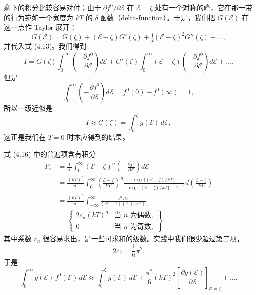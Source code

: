 剩下的积分比较容易对付；由于 $\partial f^{0}/\partial\mathcal{E}$ 在 $\mathcal{E}=\zeta$ 处有一个对称的峰，它在那一带的行为宛如一个宽度为 $kT$ 的 $\delta$ 函数（delta-function）。于是，我们把 $G(\mathcal{E})$ 在这一点作 Taylor 展开：
\begin{equation*}
G(\mathcal{E})=G(\zeta)+(\mathcal{E}-\zeta)G'(\zeta)+\tfrac{1}{2}(\mathcal{E}-\zeta)^{2}G''(\zeta)+\dots,
\tag{4.15}
\end{equation*}
并代入式 (4.13)。我们得到
\begin{equation*}
I=G(\zeta)\int_{0}^{\infty}\left(-\frac{\partial f^{0}}{\partial\mathcal{E}}\right)d\mathcal{E}+G'(\zeta)\int_{0}^{\infty}(\mathcal{E}-\zeta)\left(-\frac{\partial f^{0}}{\partial\mathcal{E}}\right)d\mathcal{E}+\dots.
\tag{4.16}
\end{equation*}
但是
\begin{equation*}
\int_{0}^{\infty}\left(-\frac{\partial f^{0}}{\partial\mathcal{E}}\right)d\mathcal{E}=f^{0}(0)-f^{0}(\infty)=1,
\tag{4.17}
\end{equation*}
所以一级近似是
\begin{equation*}
I\approx G(\zeta)=\int_{0}^{\zeta}g(\mathcal{E})\,d\mathcal{E},
\tag{4.18}
\end{equation*}
这正是我们在 $T=0$ 时本应得到的结果。


式 (4.16) 中的普遍项含有积分
\begin{align*}
F_{n}&=\frac{1}{n!}\int_{0}^{\infty}(\mathcal{E}-\zeta)^{n}\left(-\frac{\partial f^{0}}{\partial\mathcal{E}}\right)d\mathcal{E}\\
&=\frac{(kT)^{n}}{n!}\int_{0}^{\infty}\left(\frac{\mathcal{E}-\zeta}{kT}\right)^{n}\frac{\exp\{(\mathcal{E}-\zeta)/kT\}}{\left[\exp\{(\mathcal{E}-\zeta)/kT\}+1\right]^{2}}\,d\!\left(\frac{\mathcal{E}-\zeta}{kT}\right)\\
&=\frac{(kT)^{n}}{n!}\int_{-\infty}^{\infty}\frac{z^{n}\,dz}{(e^{z}+1)(1+e^{-z})}\\
&=\left\{\begin{array}{ll}
2c_{n}(kT)^{n} & \text{当 } n \text{ 为偶数},\\
0 & \text{当 } n \text{ 为奇数},
\end{array}\right\}
\tag{4.19}
\end{align*}
其中系数 $c_{n}$ 很容易求出，是一些可求和的级数。实践中我们很少超过第二项，
\begin{equation*}
2c_{2}=\frac{1}{6}\pi^{2}.
\tag{4.20}
\end{equation*}
于是
\begin{equation*}
\int_{0}^{\infty}g(\mathcal{E})\,f^{0}(\mathcal{E})\,d\mathcal{E}\approx\int_{0}^{\zeta}g(\mathcal{E})\,d\mathcal{E}+\frac{\pi^{2}}{6}(kT)^{2}\left[\frac{\partial g(\mathcal{E})}{\partial\mathcal{E}}\right]_{\mathcal{E}=\zeta}+\dots.
\tag{4.21}
\end{equation*}
